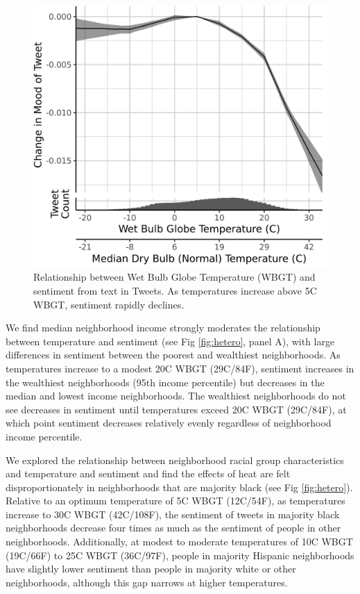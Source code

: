 \documentclass[fleqn,10pt]{wlscirep}
\begin{document}
\begin{figure}[H]
  \centering
  \includegraphics[width=0.5\linewidth]{../res/wbgt.png}
  \caption{Relationship between Wet Bulb Globe Temperature (WBGT) and sentiment from text in Tweets.  As temperatures increase above 5\textdegree C WBGT, sentiment rapidly declines.}
  \label{fig:wbgt}
\end{figure}

We find median neighborhood income strongly moderates the relationship between temperature and sentiment (see Fig \ref{fig:hetero}, panel A), with large differences in sentiment between the poorest and wealthiest neighborhoods. As temperatures increase to a modest 20\textdegree C WBGT (29\textdegree C/84\textdegree F), sentiment increases in the wealthiest neighborhoods (95th income percentile) but decreases in the median and lowest income neighborhoods. The wealthiest neighborhoods do not see decreases in sentiment until temperatures exceed 20\textdegree C WBGT (29\textdegree C/84\textdegree F), at which point sentiment decreases relatively evenly regardless of neighborhood income percentile.

We explored the relationship between neighborhood racial group characteristics and temperature and sentiment and find the effects of heat are felt disproportionately in neighborhoods that are majority black (see Fig \ref{fig:hetero}). Relative to an optimum temperature of 5\textdegree C WBGT (12\textdegree C/54\textdegree F), as temperatures increase to 30\textdegree C WBGT (42\textdegree C/108\textdegree F), the sentiment of tweets in majority black neighborhoods decrease four times as much as the sentiment of people in other neighborhoods. Additionally, at modest to moderate temperatures of 10\textdegree C WBGT (19\textdegree C/66\textdegree F) to 25\textdegree C WBGT (36\textdegree C/97\textdegree F), people in majority Hispanic neighborhoods have slightly lower sentiment than people in majority white or other neighborhoods, although this gap narrows at higher temperatures.
\end{document}
